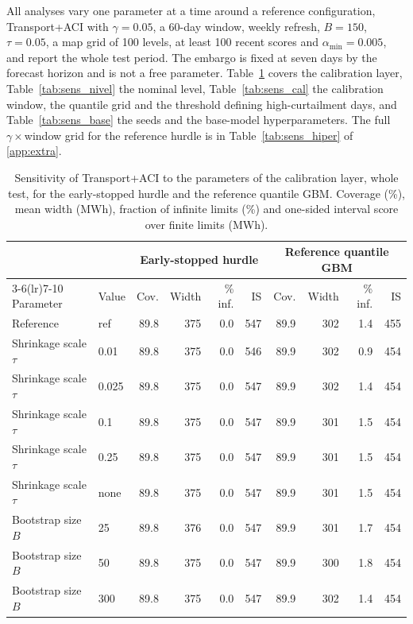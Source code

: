 All analyses vary one parameter at a time around a reference configuration, Transport+ACI with $\gamma=0.05$, a 60-day window, weekly refresh, $B=150$, $\tau=0.05$, a map grid of 100 levels, at least 100 recent scores and $\alpha_{\min}=0.005$, and report the whole test period. The embargo is fixed at seven days by the forecast horizon and is not a free parameter. Table~\ref{tab:sens_capa} covers the calibration layer, Table~\ref{tab:sens_nivel} the nominal level, Table~\ref{tab:sens_cal} the calibration window, the quantile grid and the threshold defining high-curtailment days, and Table~\ref{tab:sens_base} the seeds and the base-model hyperparameters. The full $\gamma\times$window grid for the reference hurdle is in Table~\ref{tab:sens_hiper} of \ref{app:extra}.

\begin{table}[tp]
\centering
\footnotesize
\caption{Sensitivity of Transport+ACI to the parameters of the calibration layer, whole test, for the early-stopped hurdle and the reference quantile GBM. Coverage (\%), mean width (MWh), fraction of infinite limits (\%) and one-sided interval score over finite limits (MWh).}
\label{tab:sens_capa}
\begin{tabular}{ll rrrr rrrr}
\toprule
 & & \multicolumn{4}{c}{Early-stopped hurdle} & \multicolumn{4}{c}{Reference quantile GBM} \\
\cmidrule(lr){3-6}\cmidrule(lr){7-10}
Parameter & Value & Cov. & Width & \% inf. & IS & Cov. & Width & \% inf. & IS \\
\midrule
Reference & ref & 89.8 & 375 & 0.0 & 547 & 89.9 & 302 & 1.4 & 455 \\
Shrinkage scale $\tau$ & 0.01 & 89.8 & 375 & 0.0 & 546 & 89.9 & 302 & 0.9 & 454 \\
Shrinkage scale $\tau$ & 0.025 & 89.8 & 375 & 0.0 & 547 & 89.9 & 302 & 1.4 & 454 \\
Shrinkage scale $\tau$ & 0.1 & 89.8 & 375 & 0.0 & 547 & 89.9 & 301 & 1.5 & 454 \\
Shrinkage scale $\tau$ & 0.25 & 89.8 & 375 & 0.0 & 547 & 89.9 & 301 & 1.5 & 454 \\
Shrinkage scale $\tau$ & none & 89.8 & 375 & 0.0 & 547 & 89.9 & 301 & 1.5 & 454 \\
Bootstrap size $B$ & 25 & 89.8 & 376 & 0.0 & 547 & 89.9 & 301 & 1.7 & 454 \\
Bootstrap size $B$ & 50 & 89.8 & 375 & 0.0 & 547 & 89.9 & 300 & 1.8 & 454 \\
Bootstrap size $B$ & 300 & 89.8 & 375 & 0.0 & 547 & 89.9 & 302 & 1.4 & 454 \\

\end{tabular}
\end{table}
